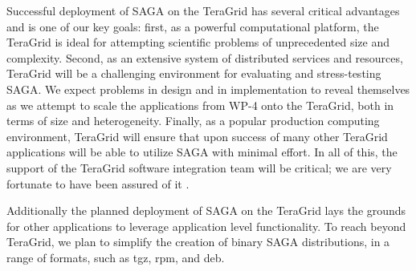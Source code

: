 \documentclass[10pt,letterpaper]{article}
\newcommand{\firstprincipleapplication}{\textit{Kalman-Filter}}
\begin{document}




 Successful deployment of SAGA on the TeraGrid has
several critical advantages and is one of our key goals: first, as a
powerful computational platform, the TeraGrid is ideal for attempting
scientific problems of unprecedented size and complexity.  Second, as
an extensive system of distributed services and resources, TeraGrid
will be a challenging environment for evaluating and stress-testing
SAGA.  We expect problems in design and in implementation to reveal
themselves as we attempt to scale the applications from WP-4 onto the
TeraGrid, both in terms of size and heterogeneity.  Finally, as a
popular production computing environment, TeraGrid will ensure that
upon success of many other TeraGrid applications will be able to
utilize SAGA with minimal effort. In all of this, the support of the
TeraGrid software integration team will be critical; we are very
fortunate to have been assured of it .

Additionally the planned deployment of SAGA on the TeraGrid lays the
grounds for other applications to leverage application level
functionality. To reach beyond TeraGrid, we plan to simplify the
creation of binary SAGA distributions, in a range of formats, such as
tgz, rpm, and deb.



\end{document}
